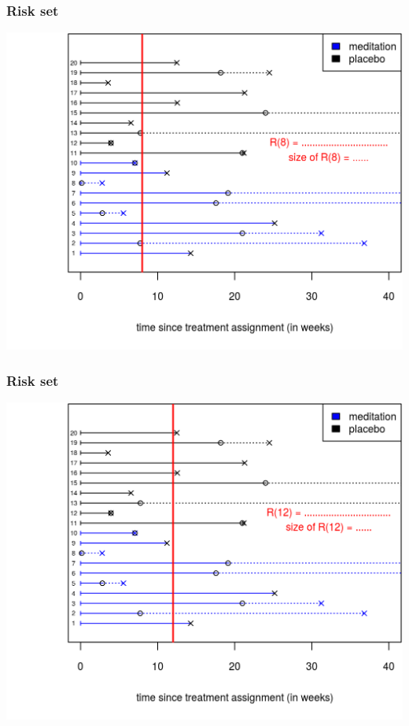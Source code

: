 \documentclass[10pt,t]{beamer}
\begin{document}
\begin{frame}
\frametitle{Risk set}
\begin{center}
\includegraphics[height=0.8\textheight]{figs/risk_set_movie_3.png}
\end{center}
\end{frame}

\begin{frame}
\frametitle{Risk set}
\begin{center}
\includegraphics[height=0.8\textheight]{figs/risk_set_movie_4.png}
\end{center}
\end{frame}
\end{document}
